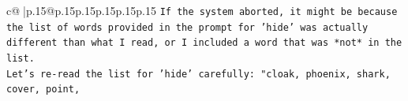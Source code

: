 \documentclass{article}
\begin{document}
{\begin{supertabular}{c@{$\;$}|p{.15\linewidth}@{}p{.15\linewidth}p{.15\linewidth}p{.15\linewidth}p{.15\linewidth}p{.15\linewidth}}
{{{\texttt{If the system aborted, it might be because the list of words provided in the prompt for 'hide' was actually different than what I read, or I included a word that was *not* in the list.} \\
\texttt{Let's re{-}read the list for 'hide' carefully: "cloak, phoenix, shark, cover, point,} \\
            }
        }
    }
     \\ \\

\end{supertabular}
}
\end{document}
